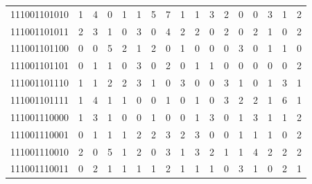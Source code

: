 \documentclass[10pt,a4paper]{article}
\begin{document}
\begin{longtable}{ |c|c|c|c|c|c|c|c|c|c|c|c|c|c|c|c|c| }
    111001101010              & 1                            & 4                                & 0                            & 1                              & 1   & 5   & 7   & 1   & 1   & 3   & 2   & 0   & 0   & 3   & 1   & 2   \\
    111001101011              & 2                            & 3                                & 1                            & 0                              & 3   & 0   & 4   & 2   & 2   & 0   & 2   & 0   & 2   & 1   & 0   & 2   \\
    111001101100              & 0                            & 0                                & 5                            & 2                              & 1   & 2   & 0   & 1   & 0   & 0   & 0   & 3   & 0   & 1   & 1   & 0   \\
    111001101101              & 0                            & 1                                & 1                            & 0                              & 3   & 0   & 2   & 0   & 1   & 1   & 0   & 0   & 0   & 0   & 0   & 2   \\
    111001101110              & 1                            & 1                                & 2                            & 2                              & 3   & 1   & 0   & 3   & 0   & 0   & 3   & 1   & 0   & 1   & 3   & 1   \\
    111001101111              & 1                            & 4                                & 1                            & 1                              & 0   & 0   & 1   & 0   & 1   & 0   & 3   & 2   & 2   & 1   & 6   & 1   \\
    111001110000              & 1                            & 3                                & 1                            & 0                              & 0   & 1   & 0   & 0   & 1   & 3   & 0   & 1   & 3   & 1   & 1   & 2   \\
    111001110001              & 0                            & 1                                & 1                            & 1                              & 2   & 2   & 3   & 2   & 3   & 0   & 0   & 1   & 1   & 1   & 0   & 2   \\
    111001110010              & 2                            & 0                                & 5                            & 1                              & 2   & 0   & 3   & 1   & 3   & 2   & 1   & 1   & 4   & 2   & 2   & 2   \\
    111001110011              & 0                            & 2                                & 1                            & 1                              & 1   & 1   & 2   & 1   & 1   & 1   & 0   & 3   & 1   & 0   & 2   & 1   \\

\end{longtable}
\end{document}
